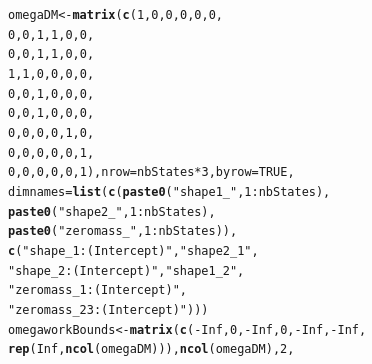 \documentclass[12pt]{article}\usepackage[]{graphicx}\usepackage[]{xcolor}
\makeatletter
\newcommand{\hlnum}[1]{\textcolor[rgb]{0.686,0.059,0.569}{#1}}%
\newcommand{\hlsng}[1]{\textcolor[rgb]{0.192,0.494,0.8}{#1}}%
\newcommand{\hlopt}[1]{\textcolor[rgb]{0,0,0}{#1}}%
\newcommand{\hldef}[1]{\textcolor[rgb]{0.345,0.345,0.345}{#1}}%
\newcommand{\hlkwb}[1]{\textcolor[rgb]{0.69,0.353,0.396}{#1}}%
\newcommand{\hlkwc}[1]{\textcolor[rgb]{0.333,0.667,0.333}{#1}}%
\newcommand{\hlkwd}[1]{\textcolor[rgb]{0.737,0.353,0.396}{\textbf{#1}}}%
\newenvironment{kframe}{%
 \def\at@end@of@kframe{}%
 \ifinner\ifhmode%
  \def\at@end@of@kframe{\end{minipage}}%
  \begin{minipage}{\columnwidth}%
 \fi\fi%
 \def\FrameCommand##1{\hskip\@totalleftmargin \hskip-\fboxsep
 \colorbox{shadecolor}{##1}\hskip-\fboxsep
     \hskip-\linewidth \hskip-\@totalleftmargin \hskip\columnwidth}%
 \MakeFramed {\advance\hsize-\width
   \@totalleftmargin\z@ \linewidth\hsize
   \@setminipage}}%
 {\par\unskip\endMakeFramed%
 \at@end@of@kframe}
\newenvironment{knitrout}{}{} %
\makeatother
\begin{document}
\begin{knitrout}
\color{fgcolor}\begin{kframe}
\begin{alltt}
\hldef{omegaDM} \hlkwb{<-} \hlkwd{matrix}\hldef{(}\hlkwd{c}\hldef{(}\hlnum{1}\hldef{,}\hlnum{0}\hldef{,}\hlnum{0}\hldef{,}\hlnum{0}\hldef{,}\hlnum{0}\hldef{,}\hlnum{0}\hldef{,}
                    \hlnum{0}\hldef{,}\hlnum{0}\hldef{,}\hlnum{1}\hldef{,}\hlnum{1}\hldef{,}\hlnum{0}\hldef{,}\hlnum{0}\hldef{,}
                    \hlnum{0}\hldef{,}\hlnum{0}\hldef{,}\hlnum{1}\hldef{,}\hlnum{1}\hldef{,}\hlnum{0}\hldef{,}\hlnum{0}\hldef{,}
                    \hlnum{1}\hldef{,}\hlnum{1}\hldef{,}\hlnum{0}\hldef{,}\hlnum{0}\hldef{,}\hlnum{0}\hldef{,}\hlnum{0}\hldef{,}
                    \hlnum{0}\hldef{,}\hlnum{0}\hldef{,}\hlnum{1}\hldef{,}\hlnum{0}\hldef{,}\hlnum{0}\hldef{,}\hlnum{0}\hldef{,}
                    \hlnum{0}\hldef{,}\hlnum{0}\hldef{,}\hlnum{1}\hldef{,}\hlnum{0}\hldef{,}\hlnum{0}\hldef{,}\hlnum{0}\hldef{,}
                    \hlnum{0}\hldef{,}\hlnum{0}\hldef{,}\hlnum{0}\hldef{,}\hlnum{0}\hldef{,}\hlnum{1}\hldef{,}\hlnum{0}\hldef{,}
                    \hlnum{0}\hldef{,}\hlnum{0}\hldef{,}\hlnum{0}\hldef{,}\hlnum{0}\hldef{,}\hlnum{0}\hldef{,}\hlnum{1}\hldef{,}
                    \hlnum{0}\hldef{,}\hlnum{0}\hldef{,}\hlnum{0}\hldef{,}\hlnum{0}\hldef{,}\hlnum{0}\hldef{,}\hlnum{1}\hldef{),}\hlkwc{nrow}\hldef{=nbStates}\hlopt{*}\hlnum{3}\hldef{,}\hlkwc{byrow}\hldef{=}\hlnum{TRUE}\hldef{,}
                \hlkwc{dimnames}\hldef{=}\hlkwd{list}\hldef{(}\hlkwd{c}\hldef{(}\hlkwd{paste0}\hldef{(}\hlsng{"shape1_"}\hldef{,}\hlnum{1}\hlopt{:}\hldef{nbStates),}
                                \hlkwd{paste0}\hldef{(}\hlsng{"shape2_"}\hldef{,}\hlnum{1}\hlopt{:}\hldef{nbStates),}
                                \hlkwd{paste0}\hldef{(}\hlsng{"zeromass_"}\hldef{,}\hlnum{1}\hlopt{:}\hldef{nbStates)),}
                              \hlkwd{c}\hldef{(}\hlsng{"shape_1:(Intercept)"}\hldef{,}\hlsng{"shape2_1"}\hldef{,}
                                \hlsng{"shape_2:(Intercept)"}\hldef{,}\hlsng{"shape1_2"}\hldef{,}
                                \hlsng{"zeromass_1:(Intercept)"}\hldef{,}
                                \hlsng{"zeromass_23:(Intercept)"}\hldef{)))}
\hldef{omegaworkBounds} \hlkwb{<-} \hlkwd{matrix}\hldef{(}\hlkwd{c}\hldef{(}\hlopt{-}\hlnum{Inf}\hldef{,}\hlnum{0}\hldef{,}\hlopt{-}\hlnum{Inf}\hldef{,}\hlnum{0}\hldef{,}\hlopt{-}\hlnum{Inf}\hldef{,}\hlopt{-}\hlnum{Inf}\hldef{,}
                            \hlkwd{rep}\hldef{(}\hlnum{Inf}\hldef{,}\hlkwd{ncol}\hldef{(omegaDM))),}\hlkwd{ncol}\hldef{(omegaDM),}\hlnum{2}\hldef{,}

\end{alltt}
\end{kframe}
\end{knitrout}
\end{document}
